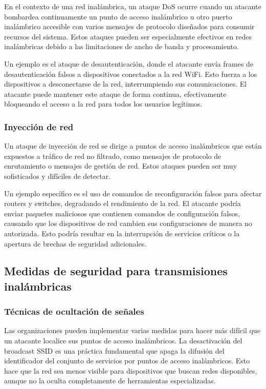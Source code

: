 En el contexto de una red inalámbrica, un ataque DoS ocurre cuando un atacante bombardea continuamente un punto de acceso inalámbrico u otro puerto inalámbrico accesible con varios mensajes de protocolo diseñados para consumir recursos del sistema. Estos ataques pueden ser especialmente efectivos en redes inalámbricas debido a las limitaciones de ancho de banda y procesamiento.

Un ejemplo es el ataque de desautenticación, donde el atacante envía frames de desautenticación falsos a dispositivos conectados a la red WiFi. Esto fuerza a los dispositivos a desconectarse de la red, interrumpiendo sus comunicaciones. El atacante puede mantener este ataque de forma continua, efectivamente bloqueando el acceso a la red para todos los usuarios legítimos.

\subsubsection{Inyección de red}

Un ataque de inyección de red se dirige a puntos de acceso inalámbricos que están expuestos a tráfico de red no filtrado, como mensajes de protocolo de enrutamiento o mensajes de gestión de red. Estos ataques pueden ser muy sofisticados y difíciles de detectar.

Un ejemplo específico es el uso de comandos de reconfiguración falsos para afectar routers y switches, degradando el rendimiento de la red. El atacante podría enviar paquetes maliciosos que contienen comandos de configuración falsos, causando que los dispositivos de red cambien sus configuraciones de manera no autorizada. Esto podría resultar en la interrupción de servicios críticos o la apertura de brechas de seguridad adicionales.

\subsection{Medidas de seguridad para transmisiones inalámbricas}

\subsubsection{Técnicas de ocultación de señales}

Las organizaciones pueden implementar varias medidas para hacer más difícil que un atacante localice sus puntos de acceso inalámbricos. La desactivación del broadcast SSID es una práctica fundamental que apaga la difusión del identificador del conjunto de servicios por puntos de acceso inalámbricos. Esto hace que la red sea menos visible para dispositivos que buscan redes disponibles, aunque no la oculta completamente de herramientas especializadas.

